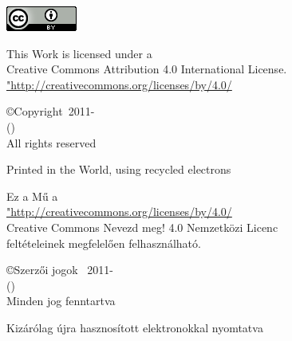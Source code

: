 \includegraphics{../../common/images/CC88x31}
  {%
\par\noindent This Work is licensed under a\\
Creative Commons Attribution 4.0 International License.\\
\url{"http://creativecommons.org/licenses/by/4.0/}

  \copyright Copyright\ 2011-\the\year\ \LectureAuthor\\
   (\LectureEmail) \\
   All rights reserved
   
Printed in the World, using recycled electrons
  }
  {
  }
  { %
 \par\noindent Ez a Mű a\\
 \url{"http://creativecommons.org/licenses/by/4.0/}\\
 Creative Commons Nevezd meg! 4.0 Nemzetközi Licenc\\
 feltételeinek megfelelően felhasználható.
  
  \copyright Szerzői jogok \ 2011-\the\year\ \LectureAuthor\\
  (\LectureEmail) \\
  Minden jog fenntartva
  
Kizárólag újra hasznosított elektronokkal nyomtatva

  }
  {
  }
